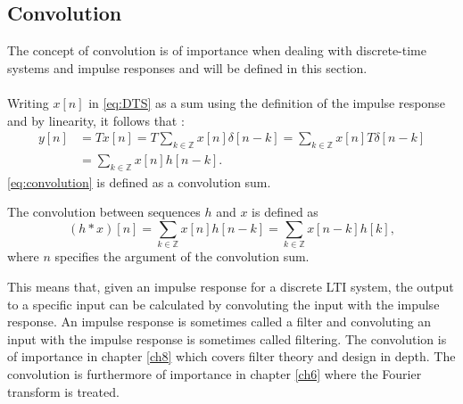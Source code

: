 \subsection{Convolution}\label{sec:convol}
The concept of convolution is of importance when dealing with discrete-time systems and impulse responses and will be defined in this section.\\\\
Writing $x[n]$ in \eqref{eq:DTS} as a sum using the definition of the impulse response and by linearity, it follows that :
\begin{align}
y[n]&=Tx[n]=T\sum_{k\in\mathbb{Z}}x[n]\delta[n-k]
=\sum_{k\in\mathbb{Z}}x[n]T\delta[n-k]\nonumber\\
&=\sum_{k\in\mathbb{Z}}x[n]h[n-k].\label{eq:convolution}
\end{align}
\eqref{eq:convolution} is defined as a convolution sum.
\begin{definition}\label{def:convolution}
The convolution between sequences $h$ and $x$ is defined as
\begin{equation}
(h*x)[n]=\sum_{k\in\mathbb{Z}}x[n]h[n-k]=\sum_{k\in\mathbb{Z}}x[n-k]h[k],
\end{equation}
where $n$ specifies the argument of the convolution sum.
\end{definition}
This means that, given an impulse response for a discrete LTI system, the output to a specific input can be calculated by convoluting the input with the impulse response. An impulse response is sometimes called a filter and convoluting an input with the impulse response is sometimes called filtering. The convolution is of importance in chapter \ref{ch8} which covers filter theory and design in depth. The convolution is furthermore of importance in chapter \ref{ch6} where the Fourier transform is treated. 